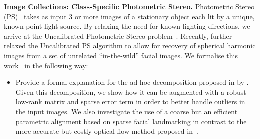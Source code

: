 \textbf{Image Collections: Class-Specific Photometric Stereo.} Photometric
Stereo (PS)~\cite{woodham1980photometric} takes as input 3 or more images of
a stationary object each lit by a unique, known point light source. 
By relaxing the need for known lighting directions, we arrive at the
Uncalibrated Photometric Stereo problem~\cite{hayakawa1994photometric,fan1997surface,yuille1999determining,basri2007photometric}.
Recently, \citet{KemelmacherShlizerman:2013iv} further relaxed the 
Uncalibrated PS algorithm to allow for recovery of spherical harmonic images 
from a set of unrelated ``in-the-wild'' facial images. We formalise this
work~\cite{KemelmacherShlizerman:2013iv} in the following way:
\begin{itemize}
	\item Provide a formal explanation for the ad hoc decomposition proposed
	      in by \citet{KemelmacherShlizerman:2013iv}. Given this decomposition,
	      we show how it can be augmented with a robust low-rank matrix and 
	      sparse error term in order to better handle outliers in the input
	      images. We also investigate the use of a coarse but an efficient
	      parametric alignment based on sparse facial landmarking in contrast to
	      the more accurate but costly optical flow method 
	      proposed in~\cite{KemelmacherShlizerman:2013iv}.
\end{itemize}

